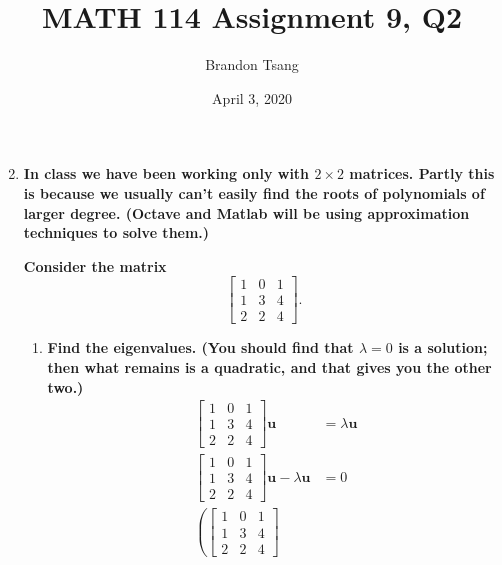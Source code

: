 \documentclass[11pt]{article}
\title{MATH 114 Assignment 9, Q2}
\author{Brandon Tsang}
\date{April 3, 2020}
\begin{document}
    \maketitle
    \begin{enumerate}[label=\textbf{\arabic*.}]
        \setcounter{enumi}{1}
        \item{
            \textbf{\boldmath In class we have been working only with $2\times2$ matrices. Partly this is because we usually can't easily find the roots of polynomials of larger degree. (Octave and Matlab will be using approximation techniques to solve them.)}
            \par
            \textbf{\boldmath Consider the matrix $$\begin{bmatrix}1 & 0 & 1 \\ 1 & 3 & 4 \\ 2 & 2 & 4\end{bmatrix}.$$}
            \begin{enumerate}[label=\textbf{(\alph*)}]
                \item{
                    \textbf{\boldmath Find the eigenvalues. (You should find that $\lambda=0$ is a solution; then what remains is a quadratic, and that gives you the other two.)}
                    \begin{align*}
                        \begin{bmatrix}
                            1 & 0 & 1 \\
                            1 & 3 & 4 \\
                            2 & 2 & 4
                        \end{bmatrix}
                        \mathbf{u}
                        &=
                        \lambda\mathbf{u} \\
                        \begin{bmatrix}
                            1 & 0 & 1 \\
                            1 & 3 & 4 \\
                            2 & 2 & 4
                        \end{bmatrix}
                        \mathbf{u}-\lambda\mathbf{u}&=0 \\
                        \left(
                        \begin{bmatrix}
                            1 & 0 & 1 \\
                            1 & 3 & 4 \\
                            2 & 2 & 4

\end{bmatrix}
\end{align*}}
\end{enumerate}}
\end{enumerate}
\end{document}
